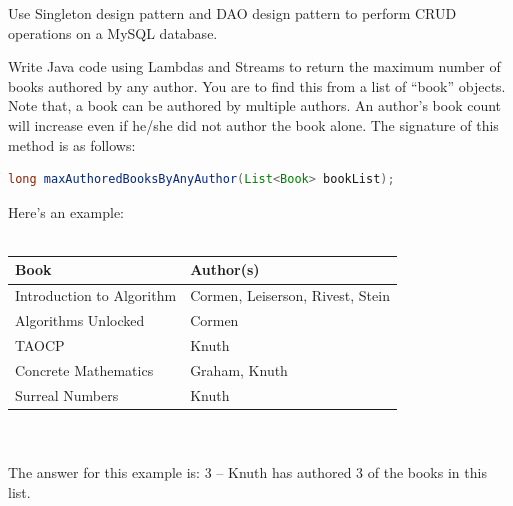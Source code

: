 \documentclass[addpoints,12pt]{exam}
\begin{document}
\begin{questions}
\question
Use Singleton design pattern and DAO design pattern to perform CRUD operations on a MySQL database.

\question[10]
Write Java code using Lambdas and Streams to return the maximum number of books authored by any author. You are to find this from a list of ``book'' objects. Note that, a book can be authored by multiple authors. An author's book count will increase even if he/she did not author the book alone. The signature of this method is as follows:
\begin{lstlisting}[language=Java]
	long maxAuthoredBooksByAnyAuthor(List<Book> bookList);
\end{lstlisting}
Here's an example:\\~\\
\begin{tabular}{|l|l|}
\hline
\textbf{Book} & \textbf{Author(s)}\\
\hline
Introduction to Algorithm & Cormen, Leiserson, Rivest, Stein\\
Algorithms Unlocked & Cormen\\
TAOCP & Knuth\\
Concrete Mathematics & Graham, Knuth\\
Surreal Numbers & Knuth\\
\hline
\end{tabular}\\~\\
The answer for this example is: 3 -- Knuth has authored 3 of the books in this list.


\end{questions}
\end{document}
